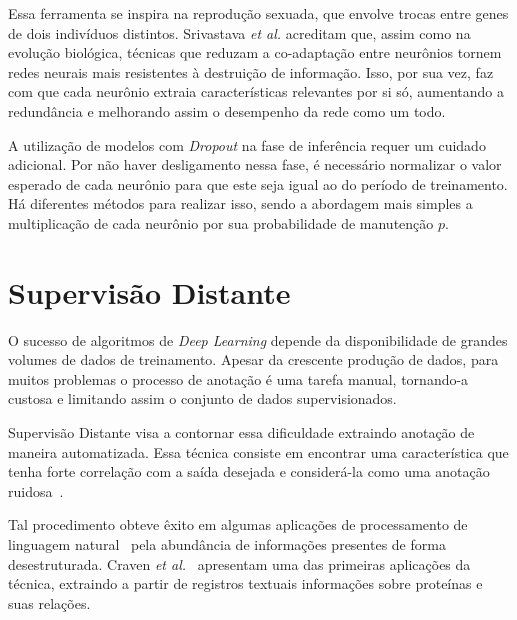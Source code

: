 Essa ferramenta se inspira na reprodução sexuada, que envolve trocas entre genes de dois indivíduos distintos.
Srivastava \textit{et al.} acreditam que, assim como na evolução biológica, técnicas que reduzam a co-adaptação entre
neurônios tornem redes neurais mais resistentes à destruição de informação.
Isso, por sua vez, faz com que cada neurônio extraia características relevantes por si só, aumentando a redundância e
melhorando assim o desempenho da rede como um todo.

A utilização de modelos com \textit{Dropout} na fase de inferência requer um cuidado adicional.
Por não haver desligamento nessa fase, é necessário normalizar o valor esperado de cada neurônio para que este seja igual
ao do período de treinamento.
Há diferentes métodos para realizar isso, sendo a abordagem mais simples a multiplicação de cada neurônio por sua
probabilidade de manutenção $p$.

\section{Supervisão Distante} \label{sec:distant_supervision}

O sucesso de algoritmos de \textit{Deep Learning} depende da disponibilidade de grandes volumes de dados de treinamento.
Apesar da crescente produção de dados, para muitos problemas o processo de anotação é uma tarefa manual, tornando-a
custosa e limitando assim o conjunto de dados supervisionados.

Supervisão Distante visa a contornar essa dificuldade extraindo anotação de maneira automatizada.
Essa técnica consiste em encontrar uma característica que tenha forte correlação com a saída desejada e considerá-la como
uma anotação ruidosa~\cite{go09}.

Tal procedimento obteve êxito em algumas aplicações de processamento de linguagem natural~\cite{craven99}\cite{go09}
pela abundância de informações presentes de forma desestruturada.
Craven \textit{et al.}~\cite{craven99} apresentam uma das primeiras aplicações da técnica, extraindo a partir de registros
textuais informações sobre proteínas e suas relações.
